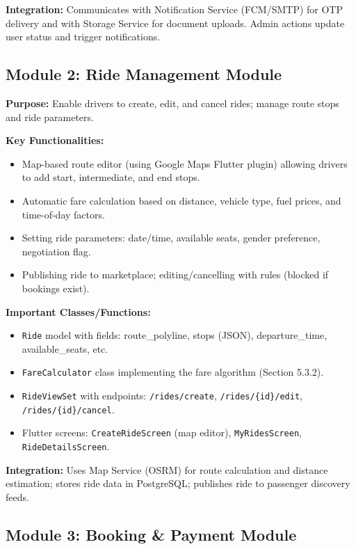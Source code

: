\textbf{Integration:} Communicates with Notification Service (FCM/SMTP) for OTP delivery and with Storage Service for document uploads. Admin actions update user status and trigger notifications.

\subsection{Module 2: Ride Management Module}

\textbf{Purpose:} Enable drivers to create, edit, and cancel rides; manage route stops and ride parameters.

\textbf{Key Functionalities:}
\begin{itemize}
    \item Map-based route editor (using Google Maps Flutter plugin) allowing drivers to add start, intermediate, and end stops.
    \item Automatic fare calculation based on distance, vehicle type, fuel prices, and time-of-day factors.
    \item Setting ride parameters: date/time, available seats, gender preference, negotiation flag.
    \item Publishing ride to marketplace; editing/cancelling with rules (blocked if bookings exist).
\end{itemize}

\textbf{Important Classes/Functions:}
\begin{itemize}
    \item \texttt{Ride} model with fields: route\_polyline, stops (JSON), departure\_time, available\_seats, etc.
    \item \texttt{FareCalculator} class implementing the fare algorithm (Section 5.3.2).
    \item \texttt{RideViewSet} with endpoints: \texttt{/rides/create}, \texttt{/rides/\{id\}/edit}, \texttt{/rides/\{id\}/cancel}.
    \item Flutter screens: \texttt{CreateRideScreen} (map editor), \texttt{MyRidesScreen}, \texttt{RideDetailsScreen}.
\end{itemize}

\textbf{Integration:} Uses Map Service (OSRM) for route calculation and distance estimation; stores ride data in PostgreSQL; publishes ride to passenger discovery feeds.

\subsection{Module 3: Booking \& Payment Module}

